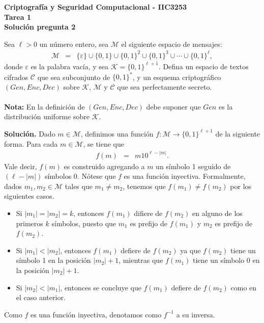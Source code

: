 \documentclass[11pt]{article}
\newcommand{\Enc}{\textit{Enc}}
\newcommand{\Dec}{\textit{Dec}}
\newcommand{\Gen}{\textit{Gen}}
\newcommand{\M}{\mathcal{M}}
\newcommand{\C}{\mathcal{C}}
\newcommand{\K}{\mathcal{K}}
\begin{document}
\begin{center}
  \bf Criptografía y Seguridad Computacional - IIC3253\\
  \bf Tarea 1\\
  \bf Solución pregunta 2
\end{center}

\bigskip

\noindent
Sea $\ell > 0$ un número entero, sea $\M$ el siguiente espacio de mensajes:
\begin{eqnarray*}
  \M &=& \{\varepsilon\} \cup \{0,1\} \cup \{0,1\}^2 \cup \{0,1\}^3 \cup \cdots \cup
  \{0,1\}^{\ell},
\end{eqnarray*}
donde $\varepsilon$ es la palabra vacía, y sea $\K
= \{0,1\}^{\ell+1}$. Defina un espacio de textos cifrados $\C$ que sea
subconjunto de $\{0,1\}^*$, y un esquema criptográfico
$(\Gen, \Enc, \Dec)$ sobre $\K$, $\M$ y $\C$ que sea perfectamente secreto.
\\
\\
{\bf Nota:} En la definición de $(\Gen, \Enc, \Dec)$ debe
suponer que $\Gen$ es la distribución uniforme sobre $\K$.

\bigskip

\noindent
{\bf Solución.} Dado $m \in \M$, definimos una función $f : \M \to
\{0,1\}^{\ell +1}$ de la siguiente forma. Para cada $m \in \M$, se
tiene que
\begin{eqnarray*}
  f(m) &=& m10^{\ell - |m|}.
\end{eqnarray*}
Vale decir, $f(m)$ es construido agregando a $m$ un símbolo 1 seguido
de $(\ell - |m|)$ símbolos 0. Nótese que $f$ es una función
inyectiva. Formalmente, dados $m_1, m_2 \in \M$ tales que $m_1 \neq
m_2$, tenemos que $f(m_1) \neq f(m_2)$ por los siguientes casos.
\begin{itemize}
\item Si $|m_1| = |m_2| = k$, entonces $f(m_1)$ difiere de $f(m_2)$ en
  alguno de los primeros $k$ símbolos, puesto que $m_1$ es prefijo de
  $f(m_1)$ y $m_2$ es prefijo de $f(m_2)$.

\item Si $|m_1| < |m_2|$, entonces $f(m_1)$ defiere de $f(m_2)$ ya que
  $f(m_2)$ tiene un símbolo 1 en la posición $|m_2| + 1$, mientras que
  $f(m_1)$ tiene un símbolo 0 en la posición $|m_2|+1$.
  
\item Si $|m_2| < |m_1|$, entonces se concluye que $f(m_1)$ defiere de
  $f(m_2)$ como en el caso anterior.
\end{itemize}
Como $f$ es una función inyectiva, denotamos como $f^{-1}$ a su inversa.
\end{document}
